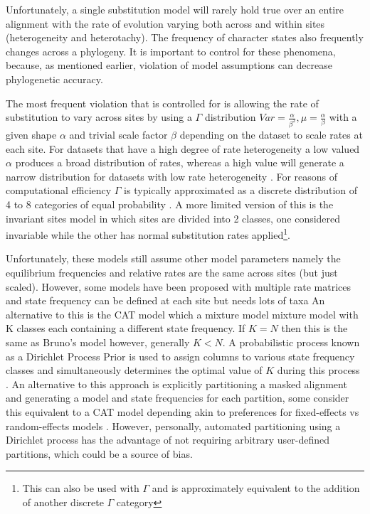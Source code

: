 Unfortunately, a single substitution model will rarely hold true over an entire
alignment with the rate of evolution varying both across and within sites (heterogeneity
and heterotachy). The frequency of character states also frequently changes
across a phylogeny.  It is important to control for these phenomena, because, 
as mentioned earlier, violation of model assumptions can decrease phylogenetic
accuracy.


The most frequent violation that is controlled for is allowing the rate of substitution to vary across
sites by using a \(\Gamma\) distribution \(Var = \frac{\alpha}{\beta^{2}}, \mu = \frac{\alpha}{\beta}\) with a given shape \(\alpha\) and 
trivial scale factor \(\beta\) depending on the dataset to scale rates at each site.
For datasets that have a high degree of rate heterogeneity a low valued \(\alpha\) produces a broad distribution of rates, whereas a high value will generate 
a narrow distribution for datasets with low rate heterogeneity \citep{Yang1993}.
For reasons of computational efficiency \(\Gamma\) is typically approximated as a discrete distribution of 4 to 8 
categories of equal probability \citep{Yang1994a}. 
A more limited version of this is the invariant sites model in which sites are divided into 2 classes, one considered invariable while the 
other has normal substitution rates applied\footnote{
    This can also be used with \(\Gamma\) and is approximately equivalent
to the addition of another discrete \(\Gamma\) category}\citep{Hasegawa1985}.



Unfortunately, these models still assume other model parameters namely the equilibrium frequencies and relative rates are the same across
sites (but just scaled).  
However, some models have been proposed with multiple rate matrices \citep{Lartillot2004} and 
state frequency can be defined at each site \citep{Bruno1996} but needs lots of taxa \citep{Lartillot2004}
An alternative to this is the CAT model which a mixture model mixture model with 
K classes each containing a different state frequency.  If \(K=N\) then this is
the same as Bruno's model however, generally \(K < N\).  A 
 probabilistic process known as a Dirichlet Process Prior is used to assign
 columns to various state frequency classes and simultaneously
 determines the optimal value of \(K\) during this process \citep{Lartillot2004}.
An alternative to this approach is explicitly partitioning a masked alignment
and generating a model and state frequencies for each partition, 
some consider this equivalent to a CAT model depending akin to preferences
for fixed-effects vs random-effects models \citep{Yang2012}.  However, personally,
automated partitioning using a Dirichlet process has the advantage of not
requiring arbitrary user-defined partitions, which could be a source of bias.


